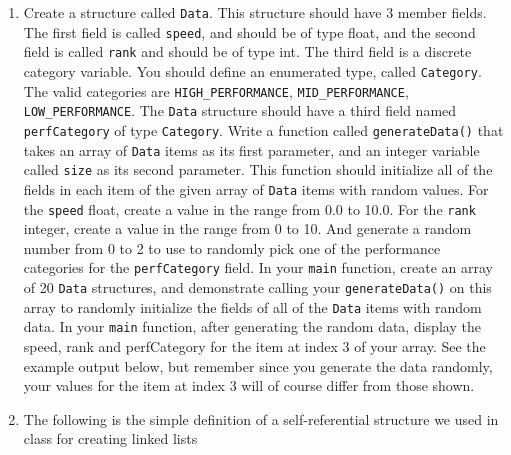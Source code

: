 \documentclass[11pt]{article}
\begin{document}
\begin{enumerate}
\item Create a structure called \verb~Data~.  This structure should have 3
   member fields.  The first field is called \verb~speed~, and should be of
   type float, and the second field is called \verb~rank~ and should be of
   type int.  The third field is a discrete category variable.  You
   should define an enumerated type, called \verb~Category~.  The valid
   categories are \verb~HIGH_PERFORMANCE~, \verb~MID_PERFORMANCE~,
   \verb~LOW_PERFORMANCE~.  The \verb~Data~ structure should have a third field
   named \verb~perfCategory~ of type \verb~Category~.  Write a function called
   \verb~generateData()~ that takes an array of \verb~Data~ items as its first
   parameter, and an integer variable called \verb~size~ as its second
   parameter.  This function should initialize all of the fields in
   each item of the given array of \verb~Data~ items with random values.
   For the \verb~speed~ float, create a value in the range from 0.0 to
   10.0.  For the \verb~rank~ integer, create a value in the range from 0
   to 10. And generate a random number from 0 to 2 to use to randomly
   pick one of the performance categories for the \verb~perfCategory~
   field.  In your \verb~main~ function, create an array of 20 \verb~Data~
   structures, and demonstrate calling your \verb~generateData()~ on this
   array to randomly initialize the fields of all of the \verb~Data~ items
   with random data.  In your \verb~main~ function, after generating the
   random data, display the speed, rank and perfCategory for the item
   at index 3 of your array.  See the example output below, but
   remember since you generate the data randomly, your values for the
   item at index 3 will of course differ from those shown.
\item The following is the simple definition of a self-referential
   structure we used in class for creating linked lists


\end{enumerate}
\end{document}
